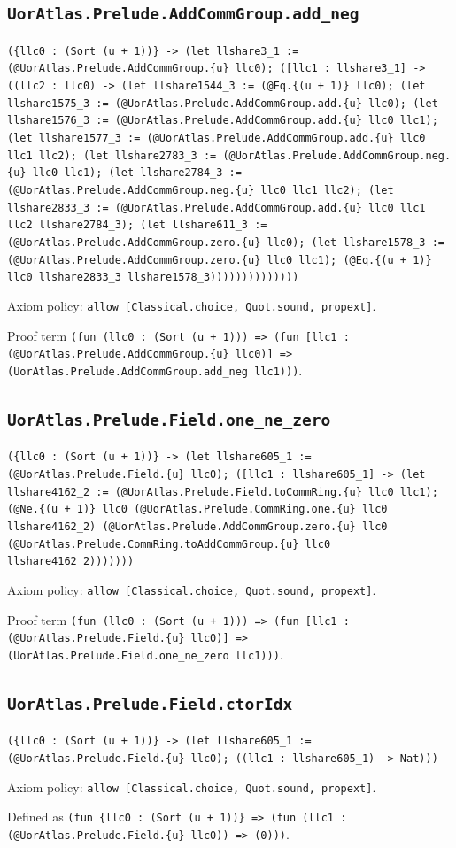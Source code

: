 \documentclass[11pt]{article}
\begin{document}
\subsection*{\texttt{UorAtlas.Prelude.AddCommGroup.add\_neg}}
\noindent\texttt{(\{llc0 : (Sort (u + 1))\} -> (let llshare3\_1 := (@UorAtlas.Prelude.AddCommGroup.\{u\} llc0); ([llc1 : llshare3\_1] -> ((llc2 : llc0) -> (let llshare1544\_3 := (@Eq.\{(u + 1)\} llc0); (let llshare1575\_3 := (@UorAtlas.Prelude.AddCommGroup.add.\{u\} llc0); (let llshare1576\_3 := (@UorAtlas.Prelude.AddCommGroup.add.\{u\} llc0 llc1); (let llshare1577\_3 := (@UorAtlas.Prelude.AddCommGroup.add.\{u\} llc0 llc1 llc2); (let llshare2783\_3 := (@UorAtlas.Prelude.AddCommGroup.neg.\{u\} llc0 llc1); (let llshare2784\_3 := (@UorAtlas.Prelude.AddCommGroup.neg.\{u\} llc0 llc1 llc2); (let llshare2833\_3 := (@UorAtlas.Prelude.AddCommGroup.add.\{u\} llc0 llc1 llc2 llshare2784\_3); (let llshare611\_3 := (@UorAtlas.Prelude.AddCommGroup.zero.\{u\} llc0); (let llshare1578\_3 := (@UorAtlas.Prelude.AddCommGroup.zero.\{u\} llc0 llc1); (@Eq.\{(u + 1)\} llc0 llshare2833\_3 llshare1578\_3))))))))))))))}\par
\noindent Axiom policy: \texttt{allow [Classical.choice, Quot.sound, propext]}.\par
\noindent Proof term \texttt{(fun (llc0 : (Sort (u + 1))) => (fun [llc1 : (@UorAtlas.Prelude.AddCommGroup.\{u\} llc0)] => (UorAtlas.Prelude.AddCommGroup.add\_neg llc1)))}.\par
\subsection*{\texttt{UorAtlas.Prelude.Field.one\_ne\_zero}}
\noindent\texttt{(\{llc0 : (Sort (u + 1))\} -> (let llshare605\_1 := (@UorAtlas.Prelude.Field.\{u\} llc0); ([llc1 : llshare605\_1] -> (let llshare4162\_2 := (@UorAtlas.Prelude.Field.toCommRing.\{u\} llc0 llc1); (@Ne.\{(u + 1)\} llc0 (@UorAtlas.Prelude.CommRing.one.\{u\} llc0 llshare4162\_2) (@UorAtlas.Prelude.AddCommGroup.zero.\{u\} llc0 (@UorAtlas.Prelude.CommRing.toAddCommGroup.\{u\} llc0 llshare4162\_2)))))))}\par
\noindent Axiom policy: \texttt{allow [Classical.choice, Quot.sound, propext]}.\par
\noindent Proof term \texttt{(fun (llc0 : (Sort (u + 1))) => (fun [llc1 : (@UorAtlas.Prelude.Field.\{u\} llc0)] => (UorAtlas.Prelude.Field.one\_ne\_zero llc1)))}.\par
\subsection*{\texttt{UorAtlas.Prelude.Field.ctorIdx}}
\noindent\texttt{(\{llc0 : (Sort (u + 1))\} -> (let llshare605\_1 := (@UorAtlas.Prelude.Field.\{u\} llc0); ((llc1 : llshare605\_1) -> Nat)))}\par
\noindent Axiom policy: \texttt{allow [Classical.choice, Quot.sound, propext]}.\par
\noindent Defined as \texttt{(fun \{llc0 : (Sort (u + 1))\} => (fun (llc1 : (@UorAtlas.Prelude.Field.\{u\} llc0)) => (0)))}.\par
\end{document}
